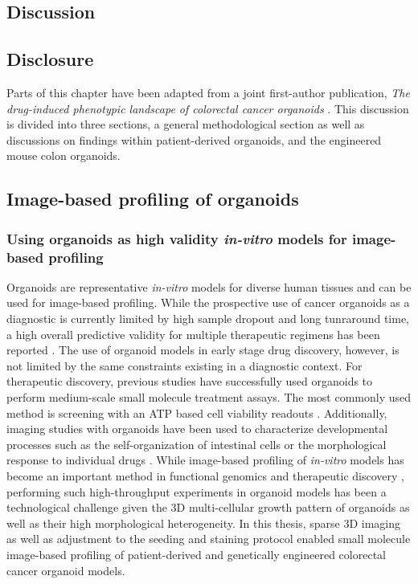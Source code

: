 \begin{flushleft}

\chapter{Discussion}

\section{Disclosure}
Parts of this chapter have been adapted from a joint first-author publication, \textit{The drug-induced phenotypic landscape of colorectal cancer organoids} \parencite{betgeDruginducedPhenotypicLandscape2022}. This discussion is divided into three sections, a general methodological section as well as discussions on findings within patient-derived organoids, and the engineered mouse colon organoids.

\section{Image-based profiling of organoids}

\subsection{Using organoids as high validity \textit{in-vitro} models for image-based profiling}

Organoids are representative \textit{in-vitro} models for diverse human tissues and can be used for image-based profiling. While the prospective use of cancer organoids as a diagnostic is currently limited by high sample dropout and long tunraround time, a high overall predictive validity for multiple therapeutic regimens has been reported \parencite{ooftProspectiveExperimentalTreatment2021}. The use of organoid models in early stage drug discovery, however, is not limited by the same constraints existing in a diagnostic context. For therapeutic discovery, previous studies have successfully used organoids to perform medium-scale small molecule treatment assays. The most commonly used method is screening with an ATP based cell viability readouts \parencite{vandeweteringProspectiveDerivationLiving2015}. Additionally, imaging studies with organoids have been used to characterize developmental processes such as the self-organization of intestinal cells \parencite{lukoninPhenotypicLandscapeIntestinal2020, boehnkeAssayEstablishmentValidation2016a} or the morphological response to individual drugs \parencite{Badder2020-au, serraSelforganizationSymmetryBreaking2019}. While image-based profiling of \textit{in-vitro} models has become an important method in functional genomics and therapeutic discovery \parencite{carpenterImagebasedChemicalScreening2007}, performing such high-throughput experiments in organoid models has been a technological challenge given the 3D multi-cellular growth pattern of organoids as well as their high morphological heterogeneity. In this thesis, sparse 3D imaging as well as adjustment to the seeding and staining protocol enabled small molecule image-based profiling of patient-derived and genetically engineered colorectal cancer organoid models. 
\bigbreak



\end{flushleft}
